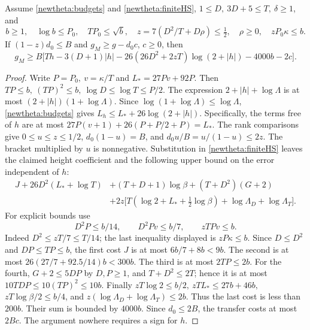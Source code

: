 \begin{proposition}\label{newtheta:absorption}
Assume \eqref{newtheta:budgets} and \eqref{newtheta:finiteHS},
\(1\le D,\ 3D+5\le T,\ \delta\ge1\), and
\[
 b\ge1,\quad \log b\le P_0,\quad TP_0\le\sqrt b,\quad
 z=7(D^2/T+D\rho)\le\tfrac12,\quad \rho\ge0,\quad
 zP_0\kappa\le b .
\]
If \((1-z)d_0\le B\) and \(g_M\ge g-d_0c\), \(c\ge0\), then
\[
 g_M\ge B\big[Th-3(D+1)|h|
       -26(26D^2+2zT)\log(2+|h|)-4000b-2c\big].
\]
\end{proposition}
\begin{proof}
Write \(P=P_0,\ v=\kappa/T\) and \(L_*=27Pv+92P\). Then
\(TP\le b,\ (TP)^2\le b,\ \log D\le\log T\le P/2\).
The expression \(2+|h|+\log\Lambda\) is at most
\((2+|h|)(1+\log\Lambda)\). Since
\(\log(1+\log\Lambda)\le\log\Lambda\), \eqref{newtheta:budgets}
gives \(L_h\le L_*+26\log(2+|h|)\). Specifically, the terms free
of \(h\) are at most \(27P(v+1)+26(P+P/2+P)=L_*\).
The rank comparisons give \(0\le u\le z\le1/2\),
\(d_0(1-u)=B\), and \(d_0u/B=u/(1-u)\le2z\).
The bracket multiplied by \(u\) is nonnegative. Substitution in
\eqref{newtheta:finiteHS} leaves the claimed height coefficient
and the following upper bound on the error independent of \(h\):
\begin{align*}
 J+26D^2(L_*+\log T)&+(T+D+1)\log\beta+(T+D^2)(G+2)\\
 &+2z\big[T(\log2+L_*+\tfrac12\log\beta)
                   +\log\Lambda_D+\log\Lambda_T\big].
\end{align*}
For explicit bounds use
\[
 D^2P\le b/14,\qquad D^2Pv\le b/7,\qquad zTPv\le b .
\]
Indeed \(D^2\le zT/7\le T/14\); the last inequality displayed
is \(zP\kappa\le b\). Since \(D\le D^2\) and \(DP\le TP\le b\),
the first cost \(J\) is at most \(6b/7+8b<9b\).
The second is at most \(26(27/7+92.5/14)b<300b\).
The third is at most \(2TP\le2b\). For the fourth,
\(G+2\le5DP\) by \(D,P\ge1\), and \(T+D^2\le2T\);
hence it is at most \(10TDP\le10(TP)^2\le10b\).
Finally \(zT\log2\le b/2,\ zT L_*\le27b+46b,\)
\(zT\log\beta/2\le b/4\), and
\(z(\log\Lambda_D+\log\Lambda_T)\le2b\).
Thus the last cost is less than \(200b\). Their sum is bounded by
\(4000b\). Since \(d_0\le2B\), the transfer costs at most \(2Bc\).
The argument nowhere requires a sign for \(h\).
\end{proof}

